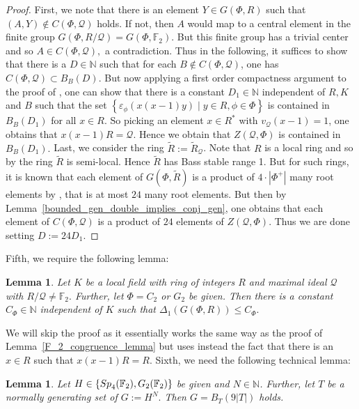 \documentclass[12pt]{amsart}
\newcommand{\C}[1]{{\mathcal #1}}
\newtheorem{lemma}[theorem]{Lemma}
\theoremstyle{definition}\newtheorem{definition}[theorem]{Definition}
\theoremstyle{remark}\newtheorem{remark}[theorem]{Remark}
\theoremstyle{definition}\newtheorem{case}{Case}
\begin{document}
\begin{proof}
First, we note that there is an element $Y\in G(\Phi,R)$ such that $(A,Y)\notin C(\Phi,\C Q)$ holds. If not, then $A$ would map to a central element in the finite group $G(\Phi,R/\C Q)=G(\Phi,\mathbb{F}_2)$. But this finite group has a trivial center and so $A\in C(\Phi,\C Q),$ a contradiction. Thus in the following, it suffices to show that there is a $D\in\mathbb{N}$ such that for each $B\notin C(\Phi,\C Q)$, one has $C(\Phi,\C Q)\subset B_B(D)$. But now applying a first order compactness argument to the proof of \cite[Theorem~4]{explicit_strong_bound_sp4_pseudo_good}, one can show that there is a constant $D_1\in\mathbb{N}$ independent of $R, K$ and $B$ such that the set $\left\{\varepsilon_{\phi}(x(x-1)y)\mid y\in R,\phi\in\Phi\right\}$ is contained in $B_B(D_1)$ for all $x\in R.$ So picking an element $x\in R^*$ with $v_{\C Q}(x-1)=1$, one obtains that $x(x-1)R=\C Q$. Hence we obtain that $Z(\C Q,\Phi)$ is contained in $B_B(D_1).$ Last, we consider the ring $\tilde{R}:=\tilde{R}_{\C Q}$. Note that $R$ is a local ring and so by \cite[Corollary~2.6]{STEIN1971140} the ring $\tilde{R}$ is semi-local. Hence $\tilde{R}$ has Bass stable range 1. But for such rings, it is known that each element of $G(\Phi,\tilde{R})$ is a product of $4\cdot|\Phi^+|$ many root elements by \cite[Theorem~1]{MR2822515}, that is at most $24$ many root elements. But then by Lemma~\ref{bounded_gen_double_implies_conj_gen}, one obtains that each element of $C(\Phi,\C Q)$ is a product of $24$ elements of $Z(\C Q,\Phi).$ Thus we are done setting $D:=24D_1.$

\end{proof}

Fifth, we require the following lemma:

\begin{lemma}\label{uniform_bound_local_c2}
Let $K$ be a local field with ring of integers $R$ and maximal ideal $\C Q$ with $R/\C Q\neq\mathbb{F}_2.$ Further, let $\Phi=C_2$ or $G_2$ be given. Then there is a constant $C_{\Phi}\in\mathbb{N}$ independent of $K$ such that $\Delta_1(G(\Phi,R))\leq C_{\Phi}.$
\end{lemma}

We will skip the proof as it essentially works the same way as the proof of Lemma~\ref{F_2_congruence_lemma} but uses instead the fact that there is an $x\in R$ such that $x(x-1)R=R.$ Sixth, we need the following technical lemma:

\begin{lemma}\label{sp_4_g2_f2}
Let $H\in\{{\rm Sp}_4(\mathbb{F}_2),G_2(\mathbb{F}_2)\}$ be given and $N\in\mathbb{N}$. Further, let $T$ be a normally generating set of $G:=H^N.$ Then $G=B_T(9|T|)$ holds.
\end{lemma}
\end{document}

